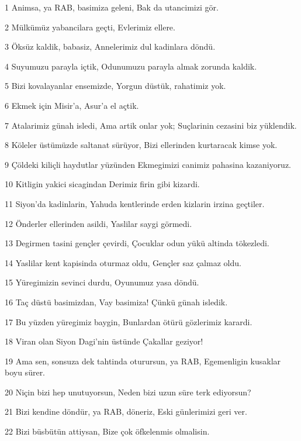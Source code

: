 \par 1 Animsa, ya RAB, basimiza geleni, Bak da utancimizi gör.
\par 2 Mülkümüz yabancilara geçti, Evlerimiz ellere.
\par 3 Öksüz kaldik, babasiz, Annelerimiz dul kadinlara döndü.
\par 4 Suyumuzu parayla içtik, Odunumuzu parayla almak zorunda kaldik.
\par 5 Bizi kovalayanlar ensemizde, Yorgun düstük, rahatimiz yok.
\par 6 Ekmek için Misir'a, Asur'a el açtik.
\par 7 Atalarimiz günah isledi, Ama artik onlar yok; Suçlarinin cezasini biz yüklendik.
\par 8 Köleler üstümüzde saltanat sürüyor, Bizi ellerinden kurtaracak kimse yok.
\par 9 Çöldeki kiliçli haydutlar yüzünden Ekmegimizi canimiz pahasina kazaniyoruz.
\par 10 Kitligin yakici sicagindan Derimiz firin gibi kizardi.
\par 11 Siyon'da kadinlarin, Yahuda kentlerinde erden kizlarin irzina geçtiler.
\par 12 Önderler ellerinden asildi, Yaslilar saygi görmedi.
\par 13 Degirmen tasini gençler çevirdi, Çocuklar odun yükü altinda tökezledi.
\par 14 Yaslilar kent kapisinda oturmaz oldu, Gençler saz çalmaz oldu.
\par 15 Yüregimizin sevinci durdu, Oyunumuz yasa döndü.
\par 16 Taç düstü basimizdan, Vay basimiza! Çünkü günah isledik.
\par 17 Bu yüzden yüregimiz baygin, Bunlardan ötürü gözlerimiz karardi.
\par 18 Viran olan Siyon Dagi'nin üstünde Çakallar geziyor!
\par 19 Ama sen, sonsuza dek tahtinda oturursun, ya RAB, Egemenligin kusaklar boyu sürer.
\par 20 Niçin bizi hep unutuyorsun, Neden bizi uzun süre terk ediyorsun?
\par 21 Bizi kendine döndür, ya RAB, döneriz, Eski günlerimizi geri ver.
\par 22 Bizi büsbütün attiysan, Bize çok öfkelenmis olmalisin.


